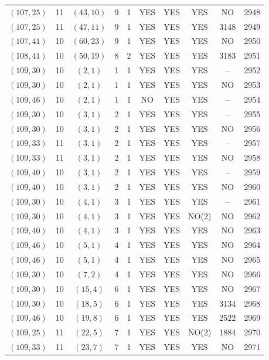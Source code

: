 \begin{longtable}{|c|c|c|c|c|c|c|c|c|c|}
$(107, 25)$ & 11 & $(43, 10)$ & 9 & 1 & YES & YES & YES & NO & 2948\\
$(107, 25)$ & 11 & $(47, 11)$ & 9 & 1 & YES & YES & YES & 3148 & 2949\\
$(107, 41)$ & 10 & $(60, 23)$ & 9 & 1 & YES & YES & YES & NO & 2950\\
$(108, 41)$ & 10 & $(50, 19)$ & 8 & 2 & YES & YES & YES & 3183 & 2951\\
$(109, 30)$ & 10 & $(2, 1)$ & 1 & 1 & YES & YES & YES & -- & 2952\\
$(109, 30)$ & 10 & $(2, 1)$ & 1 & 1 & YES & YES & YES & NO & 2953\\
$(109, 46)$ & 10 & $(2, 1)$ & 1 & 1 & NO & YES & YES & -- & 2954\\
$(109, 30)$ & 10 & $(3, 1)$ & 2 & 1 & YES & YES & YES & -- & 2955\\
$(109, 30)$ & 10 & $(3, 1)$ & 2 & 1 & YES & YES & YES & NO & 2956\\
$(109, 33)$ & 11 & $(3, 1)$ & 2 & 1 & YES & YES & YES & -- & 2957\\
$(109, 33)$ & 11 & $(3, 1)$ & 2 & 1 & YES & YES & YES & NO & 2958\\
$(109, 40)$ & 10 & $(3, 1)$ & 2 & 1 & YES & YES & YES & -- & 2959\\
$(109, 40)$ & 10 & $(3, 1)$ & 2 & 1 & YES & YES & YES & NO & 2960\\
$(109, 30)$ & 10 & $(4, 1)$ & 3 & 1 & YES & YES & YES & -- & 2961\\
$(109, 30)$ & 10 & $(4, 1)$ & 3 & 1 & YES & YES & NO(2) & NO & 2962\\
$(109, 40)$ & 10 & $(4, 1)$ & 3 & 1 & YES & YES & YES & NO & 2963\\
$(109, 46)$ & 10 & $(5, 1)$ & 4 & 1 & YES & YES & YES & NO & 2964\\
$(109, 46)$ & 10 & $(5, 1)$ & 4 & 1 & YES & YES & YES & NO & 2965\\
$(109, 30)$ & 10 & $(7, 2)$ & 4 & 1 & YES & YES & YES & NO & 2966\\
$(109, 30)$ & 10 & $(15, 4)$ & 6 & 1 & YES & YES & YES & NO & 2967\\
$(109, 30)$ & 10 & $(18, 5)$ & 6 & 1 & YES & YES & YES & 3134 & 2968\\
$(109, 46)$ & 10 & $(19, 8)$ & 6 & 1 & YES & YES & YES & 2522 & 2969\\
$(109, 25)$ & 11 & $(22, 5)$ & 7 & 1 & YES & YES & NO(2) & 1884 & 2970\\
$(109, 33)$ & 11 & $(23, 7)$ & 7 & 1 & YES & YES & YES & NO & 2971\\

\end{longtable}
